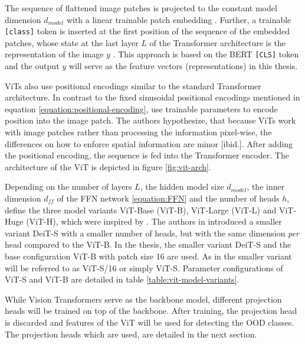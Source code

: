 The sequence of flattened image patches is projected to the constant model dimension $d_{model}$ with a linear trainable patch embedding \citep{Dosovitskiy2020,Vaswani2017}.
Further, a trainable \texttt{[class]} token is inserted at the first position of the sequence of the embedded patches, whose state at the last layer $L$ of the Transformer architecture is the representation of the image $y$ \citep{Dosovitskiy2020}.
This approach is based on the BERT \texttt{[CLS]} token \citep{Devlin2018} and the output $y$ will serve as the feature vectors (representations) in this thesis.
\par
ViTs also use positional encodings similar to the standard Transformer architecture.
In contrast to the fixed sinusoidal positional encodings mentioned in equation \ref{equation:positional-encoding}, \citep{Dosovitskiy2020} use trainable parameters to encode position into the image patch.
The authors hypothesize, that because ViTs work with image patches rather than processing the information pixel-wise, the differences on how to enforce spatial information are minor [ibid.].
After adding the positional encoding, the sequence is fed into the Transformer encoder.
The architecture of the ViT is depicted in figure \ref{fig:vit-arch}.
\par
Depending on the number of layers $L$, the hidden model size $d_{model}$, the inner dimension $d_{ff}$ of the FFN network \ref{equation:FFN} and the number of heads $h$, \citep{Dosovitskiy2020} define the three model variants ViT-Base (ViT-B), ViT-Large (ViT-L) and ViT-Huge (ViT-H), which were inspired by \citep{Devlin2018}.
The authors in \citep{Touvron2020} introduced a smaller variant DeiT-S with a smaller number of heads, but with the same dimension \textit{per} head compared to the ViT-B.
In the thesis, the smaller variant DeiT-S \citep{Touvron2020} and the base configuration ViT-B with patch size 16 are used.
As in \citep{Caron2021} the smaller variant will be referred to as ViT-S/16 or simply ViT-S.
Parameter configurations of ViT-S and ViT-B are detailed in table \ref{table:vit-model-variants}.
\par
While Vision Transformers serve as the backbone model, different projection heads will be trained on top of the backbone. 
After training, the projection head is discarded and features of the ViT will be used for detecting the OOD classes.
The projection heads which are used, are detailed in the next section.
